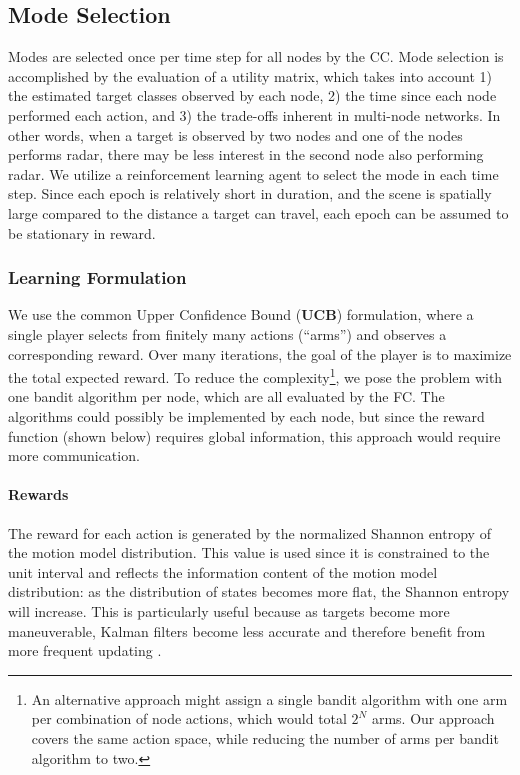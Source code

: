 \documentclass[journal,12pt,onecolumn,draftclsnofoot,]{IEEEtran}
\theoremstyle{definition}
\begin{document}
\subsection{Mode Selection}
Modes are selected once per time step for all nodes by the CC. 
Mode selection is accomplished by the evaluation of a utility matrix, which takes into account 1) the estimated target classes observed by each node, 2) the 
time since each node performed each action, and 3) the trade-offs inherent in multi-node networks. 
In other words, when a target is observed by two nodes and one of the nodes performs radar, there may be less interest in the second node also performing radar. 
We utilize a reinforcement learning agent to select the mode in each time step. 
Since each epoch is relatively short in duration, and the scene is spatially large compared to the distance a target can travel, each epoch can be assumed to be stationary in reward. 

\subsubsection{Learning Formulation}
We use the common Upper Confidence Bound (\textbf{UCB}) \cite{bandits} \cite{UCB_fischer} formulation, where a single player selects from finitely many actions (``arms'') and observes a corresponding reward. 
Over many iterations, the goal of the player is to maximize the total expected reward. 
To reduce the complexity\footnote{An alternative approach might assign a single bandit algorithm with one arm per combination of node actions, which would total $2^{N}$ arms. Our approach covers the same action space, while reducing the number of arms per bandit algorithm to two. }, we pose the problem with one bandit algorithm per node, which are all evaluated by the FC. 
The algorithms could possibly be implemented by each node, but since the reward function (shown below) requires global information, this approach would require more communication. 

\paragraph{Rewards} The reward for each action is generated by the normalized Shannon entropy of the motion model distribution. 
This value is used since it is constrained to the unit interval and reflects the information content of the motion model distribution: as the distribution of states becomes more flat, the Shannon entropy will increase. 
This is particularly useful because as targets become more maneuverable, Kalman filters become less accurate and therefore benefit from more frequent updating \cite{5977487}. 
\end{document}
